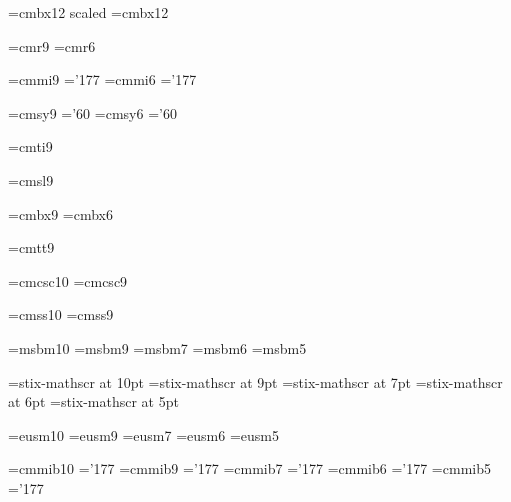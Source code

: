 \newcount\@count \newcount\@@count
\newskip\@skip   \newskip\@@skip
\newdimen\@dimen \newdimen\@@dimen
\newbox\@box     \newbox\@@box




\font\bigbf=cmbx12 scaled  %
\font\twelvebf=cmbx12 %

\font\ninerm=cmr9
\font\sixrm=cmr6

\font\ninei=cmmi9 \skewchar\ninei='177
\font\sixi=cmmi6  \skewchar\sixi='177

\font\ninesy=cmsy9 \skewchar\ninesy='60
\font\sixsy=cmsy6  \skewchar\sixsy='60

\font\nineit=cmti9

\font\ninesl=cmsl9

\font\ninebf=cmbx9
\font\sixbf=cmbx6

\font\ninett=cmtt9

\font\tensc=cmcsc10
\font\ninesc=cmcsc9

\font\tenss=cmss10
\font\niness=cmss9

\font\tenbb=msbm10
\font\ninebb=msbm9
\font\sevenbb=msbm7
\font\sixbb=msbm6
\font\fivebb=msbm5

\font\tenscr=stix-mathscr at 10pt
\font\ninescr=stix-mathscr at 9pt
\font\sevenscr=stix-mathscr at 7pt
\font\sixscr=stix-mathscr at 6pt
\font\fivescr=stix-mathscr at 5pt

\font\teneucal=eusm10
\font\nineeucal=eusm9
\font\seveneucal=eusm7
\font\sixeucal=eusm6
\font\fiveeucal=eusm5

\font\tenbmit=cmmib10  \skewchar\tenbmit='177
\font\ninebmit=cmmib9  \skewchar\ninebmit='177
\font\sevenbmit=cmmib7 \skewchar\sevenbmit='177
\font\sixbmit=cmmib6   \skewchar\sixbmit='177
\font\fivebmit=cmmib5  \skewchar\fivebmit='177

\chardef{}
\chardef{}
\chardef{}
\chardef{}
\newfam\scfam
\newfam\ssfam
\newfam\bbfam
\newfam\scrfam
\newfam\eucalfam
\newfam\bmitfam

